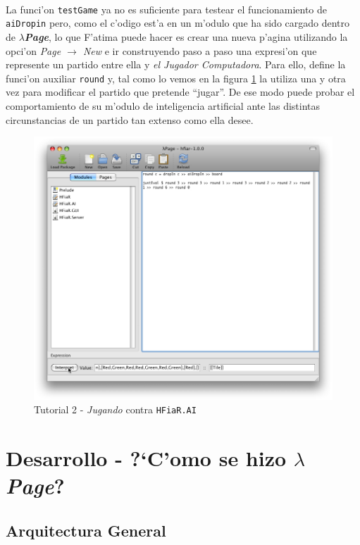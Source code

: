 \documentclass[a4paper]{article}
\newcommand{\hpage}{\textbf{\textsl{$\lambda$Page}}}
\begin{document}
\paragraph{} La funci'on \texttt{testGame} ya no es suficiente para testear el funcionamiento de \texttt{aiDropin} pero, como el c'odigo est'a en un m'odulo que ha sido cargado dentro de \hpage, lo que F'atima puede hacer es crear una nueva p'agina utilizando la opci'on \textsl{Page $\rightarrow$ New} e ir construyendo paso a paso una expresi'on que represente un partido entre ella y \textsl{el Jugador Computadora}.  Para ello, define la funci'on auxiliar \texttt{round} y, tal como lo vemos en la figura \ref{tut210} la utiliza una y otra vez para modificar el partido que pretende ``jugar''.  De ese modo puede probar el comportamiento de su m'odulo de inteligencia artificial ante las distintas circunstancias de un partido tan extenso como ella desee.
\begin{figure}[hp]
	\begin{center}
        	\includegraphics[width=.75\textwidth]{pictures/tut2/09}
		\caption{Tutorial 2 - \textsl{Jugando} contra \texttt{HFiaR.AI}}
		\label{tut210}
	\end{center}
\end{figure}

\newpage
\section{Desarrollo - ?`C'omo se hizo \hpage?}
\subsection{Arquitectura General}
\begin{epigraphs}
\end{epigraphs}
\end{document}

